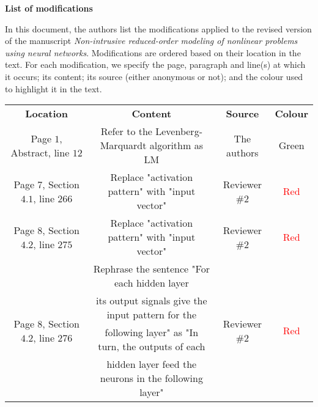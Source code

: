 \documentclass[longtitle]{elsarticle}
\theoremstyle{theorem}
\theoremstyle{definition}
\theoremstyle{remark}
\theoremstyle{proposition}
\numberwithin{figure}{section}
\begin{document}
	\Large{\textbf{List of modifications}} \\
	\normalsize

	In this document, the authors list the modifications applied to the revised version of the manuscript \emph{Non-intrusive reduced-order modeling of nonlinear problems using neural networks}. Modifications are ordered based on their location in the text. For each modification, we specify the page, paragraph and line(s) at which it occurs; its content; its source (either anonymous or not); and the colour used to highlight it in the text. 

	\setlength\extrarowheight{5pt}
		
	\begin{longtable}{c|c|c|c}
		\cline{1-4}
		\multicolumn{1}{|c|}{\textbf{Location}} & 
		\multicolumn{1}{c|}{\textbf{Content}} &
		\multicolumn{1}{c|}{\textbf{Source}} &
		\multicolumn{1}{c|}{\textbf{Colour}} \\
		\cline{1-4}
		\multicolumn{1}{|c|}{Page $1$, Abstract, line $12$} & 
		\multicolumn{1}{c|}{Refer to the Levenberg-Marquardt algorithm as LM} &
		\multicolumn{1}{c|}{The authors} &
		\multicolumn{1}{c|}{\textcolor{deepgreen}{Green}} \\
		\cline{1-4}
		\multicolumn{1}{|c|}{Page $7$, Section $4.1$, line $266$} & 
		\multicolumn{1}{c|}{Replace "activation pattern" with "input vector"} &
		\multicolumn{1}{c|}{Reviewer \#2} &
		\multicolumn{1}{c|}{\textcolor{red}{Red}} \\
		\cline{1-4}
		\multicolumn{1}{|c|}{Page $8$, Section $4.2$, line $275$} & 
		\multicolumn{1}{c|}{Replace "activation pattern" with "input vector"} &
		\multicolumn{1}{c|}{Reviewer \#2} &
		\multicolumn{1}{c|}{\textcolor{red}{Red}} \\
		\cline{1-4}
		\multicolumn{1}{|c|}{\multirow{4}{*}{Page $8$, Section $4.2$, line $276$}} & 
		\multicolumn{1}{c|}{Rephrase the sentence "For each hidden layer} &
		\multicolumn{1}{c|}{\multirow{4}{*}{Reviewer \#2}} &
		\multicolumn{1}{c|}{\multirow{4}{*}{\textcolor{red}{Red}}} \\[-0.1cm]
		\multicolumn{1}{|c|}{} &
		\multicolumn{1}{c|}{its output signals give the input pattern for the} &
		\multicolumn{1}{c|}{} &
		\multicolumn{1}{c|}{} \\[-0.1cm]
		\multicolumn{1}{|c|}{} &
		\multicolumn{1}{c|}{following layer" as "In turn, the outputs of each} &
		\multicolumn{1}{c|}{} &
		\multicolumn{1}{c|}{} \\[-0.1cm]
		\multicolumn{1}{|c|}{} &
		\multicolumn{1}{c|}{hidden layer feed the neurons in the following layer"} &

\end{longtable}
\end{document}
